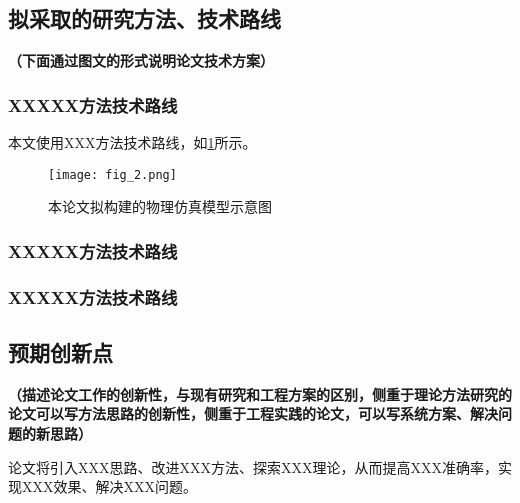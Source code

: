 \subsection{拟采取的研究方法、技术路线}

\textbf{\color{red}（下面通过图文的形式说明论文技术方案）}

\subsubsection{XXXXX方法技术路线}

本文使用XXX方法技术路线，如\cref{fig_2}所示。

\begin{figure}[ht]
	\centering
	\texttt{[image: fig\_2.png]}
	\caption{本论文拟构建的物理仿真模型示意图}
	\label{fig_2}
\end{figure}

\subsubsection{XXXXX方法技术路线}

\subsubsection{XXXXX方法技术路线}

\subsection{预期创新点}
\textbf{\color{red}（描述论文工作的创新性，与现有研究和工程方案的区别，侧重于理论方法研究的论文可以写方法思路的创新性，侧重于工程实践的论文，可以写系统方案、解决问题的新思路）}

论文将引入XXX思路、改进XXX方法、探索XXX理论，从而提高XXX准确率，实现XXX效果、解决XXX问题。

\clearpage

